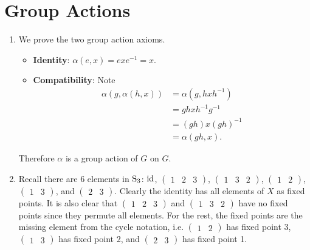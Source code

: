 \section{Group Actions}
\begin{enumerate}
    \item We prove the two group action axioms.
    \begin{itemize}
        \item \textbf{Identity}: $\alpha(e, x) = exe^{-1} = x$.
        \item \textbf{Compatibility}: Note
        \begin{align*}
            \alpha(g, \alpha(h, x)) &= \alpha(g, hxh^{-1})\\
            &= ghxh^{-1}g^{-1}\\
            &= (gh)x(gh)^{-1}\\
            &= \alpha(gh, x).
        \end{align*}
    \end{itemize}
    Therefore $\alpha$ is a group action of $G$ on $G$.

    \item Recall there are 6 elements in $\mathrm{S}_{3}$: $\mathrm{id}$, $\begin{pmatrix}1 & 2 & 3\end{pmatrix}$, $\begin{pmatrix}1 & 3 & 2\end{pmatrix}$, $\begin{pmatrix}1 & 2\end{pmatrix}$, $\begin{pmatrix}1 & 3\end{pmatrix}$, and $\begin{pmatrix}2 & 3\end{pmatrix}$. Clearly the identity has all elements of $X$ as fixed points. It is also clear that $\begin{pmatrix}1 & 2 & 3\end{pmatrix}$ and $\begin{pmatrix}1 & 3 & 2\end{pmatrix}$ have no fixed points since they permute all elements. For the rest, the fixed points are the missing element from the cycle notation, i.e. $\begin{pmatrix}1 & 2\end{pmatrix}$ has fixed point 3, $\begin{pmatrix}1 & 3\end{pmatrix}$ has fixed point 2, and $\begin{pmatrix}2 & 3\end{pmatrix}$ has fixed point 1.


\end{enumerate}
